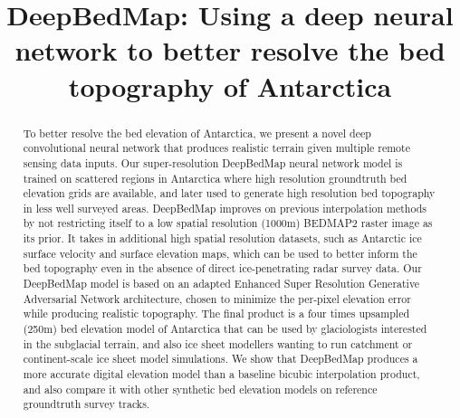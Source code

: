 \documentclass[tc, manuscript]{copernicus}
\begin{document}
\title{DeepBedMap: Using a deep neural network to better resolve the bed topography of Antarctica}














\received{}
\pubdiscuss{} %
\revised{}
\accepted{}
\published{}




\maketitle



\begin{abstract}
To better resolve the bed elevation of Antarctica, we present a novel deep convolutional neural network that produces realistic terrain given multiple remote sensing data inputs.
Our super-resolution DeepBedMap neural network model is trained on scattered regions in Antarctica where high resolution groundtruth bed elevation grids are available, and later used to generate high resolution bed topography in less well surveyed areas.
DeepBedMap improves on previous interpolation methods by not restricting itself to a low spatial resolution (1000m) BEDMAP2 raster image as its prior.
It takes in additional high spatial resolution datasets, such as Antarctic ice surface velocity and surface elevation maps, which can be used to better inform the bed topography even in the absence of direct ice-penetrating radar survey data.
Our DeepBedMap model is based on an adapted Enhanced Super Resolution Generative Adversarial Network architecture, chosen to minimize the per-pixel elevation error while producing realistic topography.
The final product is a four times upsampled (250m) bed elevation model of Antarctica that can be used by glaciologists interested in the subglacial terrain, and also ice sheet modellers wanting to run catchment or continent-scale ice sheet model simulations.
We show that DeepBedMap produces a more accurate digital elevation model than a baseline bicubic interpolation product, and also compare it with other synthetic bed elevation models on reference groundtruth survey tracks.
\end{abstract}
\end{document}
